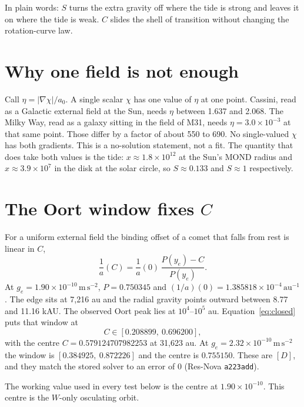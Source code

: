 \documentclass[11pt]{article}
\begin{document}
In plain words: \(S\) turns the extra gravity off where the tide is strong and leaves it on where the tide is weak. \(C\) slides the shell of transition without changing the rotation-curve law.

\section{Why one field is not enough}

Call \(\eta = |\nabla\chi|/a_0\). A single scalar \(\chi\) has one value of \(\eta\) at one point. Cassini, read as a Galactic external field at the Sun, needs \(\eta\) between 1.637 and 2.068. The Milky Way, read as a galaxy sitting in the field of M31, needs \(\eta = 3.0\times 10^{-3}\) at that same point. Those differ by a factor of about 550 to 690. No single-valued \(\chi\) has both gradients. This is a no-solution statement, not a fit. The quantity that does take both values is the tide: \(x \approx 1.8\times 10^{12}\) at the Sun's MOND radius and \(x \approx 3.9\times 10^{7}\) in the disk at the solar circle, so \(S \approx 0.133\) and \(S \approx 1\) respectively.

\section{The Oort window fixes \(C\)}

For a uniform external field the binding offset of a comet that falls from rest is linear in \(C\),
\begin{equation}
\frac{1}{a}(C) = \frac{1}{a}(0)\,\frac{P(y_e)-C}{P(y_e)}.
\label{eq:closed}
\end{equation}
At \(g_e = 1.90\times 10^{-10}\,\mathrm{m\,s^{-2}}\), \(P = 0.750345\) and \((1/a)(0) = 1.385818\times 10^{-4}\,\mathrm{au^{-1}}\). The edge sits at 7{,}216 au and the radial gravity points outward between 8.77 and 11.16 kAU. The observed Oort peak lies at \(10^{4}\)--\(10^{5}\) au. Equation~\eqref{eq:closed} puts that window at
\[
C \in [0.208899,\ 0.696200],
\]
with the centre \(C = 0.579124707982253\) at 31{,}623 au. At \(g_e = 2.32\times 10^{-10}\,\mathrm{m\,s^{-2}}\) the window is \([0.384925,\ 0.872226]\) and the centre is \(0.755150\). These are \([D]\), and they match the stored solver to an error of 0 (Res-Nova \texttt{a223add}).

The working value used in every test below is the centre at \(1.90\times 10^{-10}\). This centre is the \(W\)-only osculating orbit.
\end{document}
